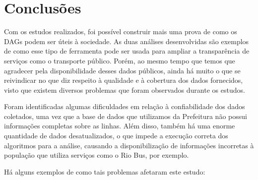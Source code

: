 \chapter{Conclusões}\label{chp:CAP_CONCLUSOES}

Com os estudos realizados, foi possível construir mais uma prova de como os DAGs podem ser úteis à sociedade. As duas análises desenvolvidas são exemplos de como esse tipo de ferramenta pode ser usada para ampliar a transparência de serviços como o transporte público. Porém, ao mesmo tempo que temos que agradecer pela disponibilidade desses dados públicos, ainda há muito o que se reivindicar no que diz respeito à qualidade e à cobertura dos dados fornecidos, visto que existem diversos problemas que foram observados durante os estudos.

Foram identificadas algumas dificuldades em relação à confiabilidade dos dados coletados, uma vez que a base de dados que utilizamos da Prefeitura não possui informações completas sobre as linhas. Além disso, também há uma enorme quantidade de dados desatualizados, o que impede a execução correta dos algoritmos para a análise, causando a disponibilização de informações incorretas à população que utiliza serviços como o Rio Bus, por exemplo. 

Há alguns exemplos de como tais problemas afetaram este estudo:

